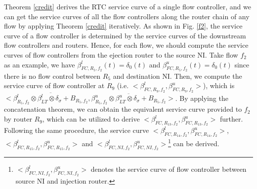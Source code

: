 \documentclass[preprint]{elsarticle}
\begin{document}
Theorem \ref{credit} derives the RTC service curve of a single flow controller, and we can get the service curves of all the flow controllers along the router chain of any flow by applying Theorem \ref{credit} iteratively. As shown in Fig. \ref{f2}, the service curve of a flow controller is determined by the service curves of the downstream flow controllers and routers. Hence, for each flow, we should compute the service curves of flow controllers from the ejection router to the source NI. Take flow $f_2$ as an example, we have $\beta_{FC,R_5,f_2}^l(t)=\delta_0(t)$ and $\beta_{FC,R_5,f_2}^u(t)=\delta_0(t)$ since there is no flow control between $R_5$ and destination NI. Then, we compute the service curve of flow controller at $R_{9}$ (i.e. $<\beta_{FC,R_9,f_2}^l,\beta_{FC,R_9,f_2}^u>$), which is $<\overline{\beta_{R_5,f_2}^l\otimes\beta_{LT}^l\otimes\delta_\sigma+B_{R_5,f_2}},\overline{\beta_{R_5,f_2}^u\otimes\beta_{LT}^u\otimes\delta_\sigma+B_{R_5,f_2}}>$. By applying the concatenation theorem, we can obtain the equivalent service curve provided to $f_2$ by router $R_{9}$, which can be utilized to derive $<\beta_{FC,R_{13},f_2}^l,\beta_{FC,R_{13},f_2}^u>$ further. Following the same procedure, the service curve $<\beta_{FC,R_{14},f_2}^l,\beta_{FC,R_{14},f_2}^u>$, $<\beta_{FC,R_{15},f_2}^l,\beta_{FC,R_{15},f_2}^u>$ and $<\beta_{FC,NI,f_2}^l,\beta_{FC,NI,f_2}^u>$\footnote{$<\beta_{FC,NI,f_2}^l,\beta_{FC,NI,f_2}^u>$ denotes the service curve of flow controller between source NI and injection router.} can be derived.
\end{document}
